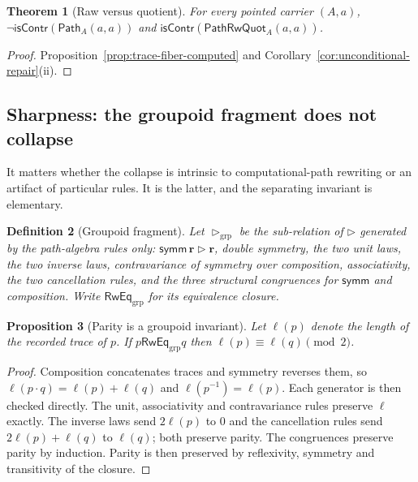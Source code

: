 \documentclass[10pt,reqno]{amsart}
\newtheorem{theorem}{Theorem}[section]
\newtheorem{proposition}[theorem]{Proposition}
\newtheorem{definition}[theorem]{Definition}
\newcommand{\isContr}{\mathsf{isContr}}
\newcommand{\PathTy}{\mathsf{Path}}
\newcommand{\PRW}{\mathsf{PathRwQuot}}
\begin{document}
\begin{theorem}[Raw versus quotient]
\label{thm:raw-vs-quotient}
For every pointed carrier \((A,a)\),
\(\neg\isContr(\PathTy_A(a,a))\) and \(\isContr(\PRW_A(a,a))\).
\end{theorem}

\begin{proof}
Proposition~\ref{prop:trace-fiber-computed} and
Corollary~\ref{cor:unconditional-repair}(ii).
\end{proof}

\subsection{Sharpness: the groupoid fragment does not collapse}
\label{subsec:sharpness}

It matters whether the collapse is intrinsic to computational-path rewriting or
an artifact of particular rules.  It is the latter, and the separating invariant
is elementary.

\begin{definition}[Groupoid fragment]
\label{def:groupoid-fragment}
Let \(\triangleright_{\mathrm{grp}}\) be the sub-relation of \(\triangleright\)
generated by the path-algebra rules only:
\(\mathsf{symm}\,\mathbf r\triangleright\mathbf r\),
double symmetry, the two unit laws, the two inverse laws, contravariance of
symmetry over composition, associativity, the two cancellation rules, and the
three structural congruences for \(\mathsf{symm}\) and composition.  Write
\(\mathrel{\mathsf{RwEq}}_{\mathrm{grp}}\) for its equivalence closure.
\end{definition}

\begin{proposition}[Parity is a groupoid invariant]
\label{prop:parity-invariant}
Let \(\ell(p)\) denote the length of the recorded trace of \(p\).  If
\(p\mathrel{\mathsf{RwEq}}_{\mathrm{grp}}q\) then
\(\ell(p)\equiv\ell(q)\pmod 2\).
\end{proposition}

\begin{proof}
Composition concatenates traces and symmetry reverses them, so
\(\ell(p\cdot q)=\ell(p)+\ell(q)\) and \(\ell(p^{-1})=\ell(p)\).  Each generator
is then checked directly.  The unit, associativity and contravariance rules
preserve \(\ell\) exactly.  The inverse laws send \(2\ell(p)\) to \(0\) and the
cancellation rules send \(2\ell(p)+\ell(q)\) to \(\ell(q)\); both preserve
parity.  The congruences preserve parity by induction.  Parity is then
preserved by reflexivity, symmetry and transitivity of the closure.
\end{proof}
\end{document}
